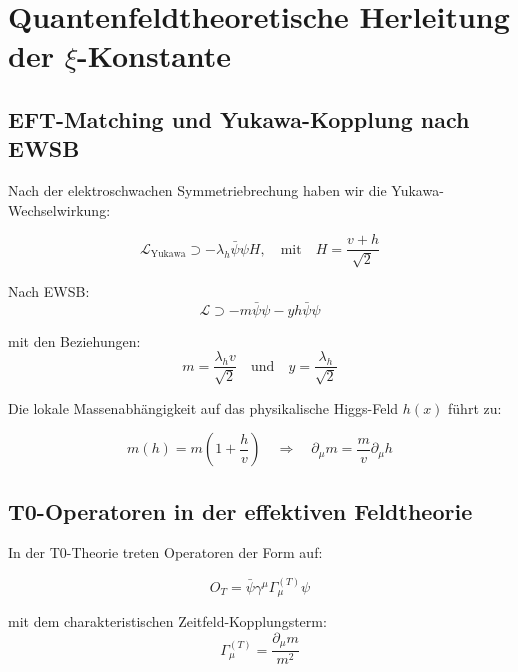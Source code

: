 	\section{Quantenfeldtheoretische Herleitung der $\xi$-Konstante}
	\label{sec:qft_herleitung}
	
	\subsection{EFT-Matching und Yukawa-Kopplung nach EWSB}
	\label{subsec:eft_matching}
	
	Nach der elektroschwachen Symmetriebrechung haben wir die Yukawa-Wechselwirkung:
	
	\begin{equation}
		\mathcal{L}_{\text{Yukawa}} \supset -\lambda_h \bar{\psi}\psi H, \quad \text{mit} \quad H = \frac{v + h}{\sqrt{2}}
	\end{equation}
	
	Nach EWSB:
	\begin{equation}
		\mathcal{L} \supset -m \bar{\psi}\psi - y h \bar{\psi}\psi
	\end{equation}
	
	mit den Beziehungen:
	\begin{equation}
		m = \frac{\lambda_h v}{\sqrt{2}} \quad \text{und} \quad y = \frac{\lambda_h}{\sqrt{2}}
	\end{equation}
	
	Die lokale Massenabhängigkeit auf das physikalische Higgs-Feld $h(x)$ führt zu:
	
	\begin{equation}
		m(h) = m\left(1 + \frac{h}{v}\right) \quad \Rightarrow \quad \partial_\mu m = \frac{m}{v}\partial_\mu h
	\end{equation}
	
	\subsection{T0-Operatoren in der effektiven Feldtheorie}
	\label{subsec:t0_operators}
	
	In der T0-Theorie treten Operatoren der Form auf:
	
	\begin{equation}
		O_T = \bar{\psi}\gamma^\mu\Gamma_\mu^{(T)}\psi
	\end{equation}
	
	mit dem charakteristischen Zeitfeld-Kopplungsterm:
	\begin{equation}
		\Gamma_\mu^{(T)} = \frac{\partial_\mu m}{m^2}
	\end{equation}
	
